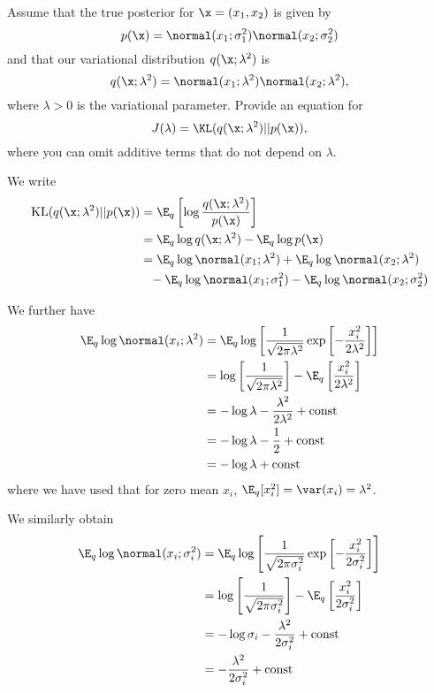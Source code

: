 \begin{exenumerate}

\item Assume that the true posterior for $\x = (x_1, x_2)$ is given by
  \begin{equation}
    p(\x) = \normal(x_1 ; \sigma_1^2)\normal(x_2 ; \sigma_2^2) 
  \end{equation}
  and that our variational distribution $q(\x; \lambda^2)$ is
  \begin{equation}
    q(\x; \lambda^2) = \normal(x_1 ; \lambda^2)\normal(x_2 ; \lambda^2),
  \end{equation}
  where $\lambda >0$ is the variational parameter. Provide an
  equation for
  \begin{equation}
    J(\lambda) = \KL(q(\x; \lambda^2) || p(\x)),
  \end{equation}
  where you can omit additive terms that do not depend on
  $\lambda$. 

  \begin{solution}

    We write
    \begin{align}
      \text{KL}(q(\x; \lambda^2) || p(\x)) & = \E_q \left[ \log  \frac{q(\x; \lambda^2)}{p(\x)} \right]\\
      & = \E_q \log q(\x; \lambda^2) - \E_q \log p(\x)\\
      & = \E_q \log  \normal(x_1 ; \lambda^2) + \E_q \log \normal(x_2 ; \lambda^2) \nonumber \\
      & \phantom{=} - \E_q \log \normal(x_1 ; \sigma_1^2) - \E_q \log \normal(x_2 ; \sigma_2^2)
    \end{align}
    
    We further have
    \begin{align}
      \E_q \log  \normal(x_i ; \lambda^2) & = \E_q \log \left[ \frac{1}{\sqrt{2\pi \lambda^2}} \exp \left[-\frac{x_i^2}{2 \lambda^2} \right] \right]\\
      & = \log \left[ \frac{1}{\sqrt{2\pi \lambda^2}}\right] -\E_q \left[\frac{x_i^2}{2 \lambda^2}\right]\\
      & = -\log \lambda - \frac{\lambda^2}{2\lambda^2} + \text{const}\\
      & = -\log \lambda - \frac{1}{2} + \text{const}\\
      & = -\log \lambda + \text{const}
    \end{align}
    where we have used that for zero mean $x_i$, $\E_q [x_i^2] = \var(x_i) = \lambda^2$. 

    We similarly obtain
    \begin{align}
    \E_q \log \normal(x_i ; \sigma_i^2) & = \E_q \log \left[ \frac{1}{\sqrt{2\pi \sigma_i^2}} \exp \left[-\frac{x_i^2}{2 \sigma_i^2} \right] \right]\\
      & = \log \left[ \frac{1}{\sqrt{2\pi \sigma_i^2}}\right] -\E_q \left[\frac{x_i^2}{2 \sigma_i^2}\right]\\
    & = -\log \sigma_i - \frac{\lambda^2}{2\sigma_i^2} + \text{const}\\
    & = - \frac{\lambda^2}{2\sigma_i^2} + \text{const}
    \end{align}
    

\end{solution}
\end{exenumerate}
